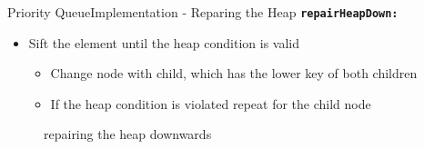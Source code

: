 \begin{frame}{Priority Queue}{Implementation - Reparing the Heap}
  {\color{Mittel-Blau}\texttt{\textbf{repairHeapDown:}}}
  \begin{itemize}
    \item<2->
      {\color{Mittel-Blau}Sift} the element until the
      {\color{Mittel-Blau}heap condition} is valid
      \begin{itemize}
        \item<3->
          Change node with child, which has the lower key of both children
        \item<4->
          If the {\color{Mittel-Blau}heap condition} is violated repeat for
          the child node
      \end{itemize}
  \end{itemize}
   \begin{figure}[!h]%
    \begin{columns}%
      \begin{column}{0.45\linewidth}%
        \begin{adjustbox}{width=\linewidth}%
        \end{adjustbox}%
      \end{column}%
      \begin{column}{0.45\linewidth}%
        \begin{adjustbox}{width=\linewidth}%
        \end{adjustbox}%
      \end{column}%
    \end{columns}%
    \caption{repairing the heap downwards}%
    \label{fig:priority_queue:impl_repair_heap_down}%
  \end{figure}
\end{frame}


